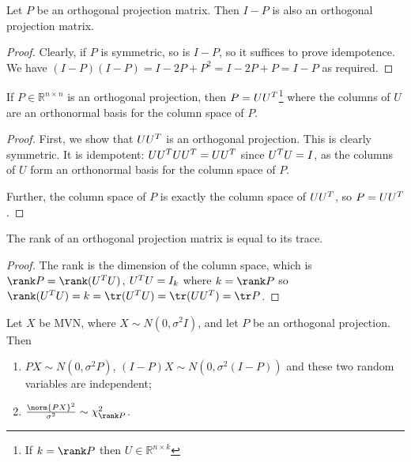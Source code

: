 \begin{corollary}
	Let $P$ be an orthogonal projection matrix.
	Then $I-P$ is also an orthogonal projection matrix.
\end{corollary}

\begin{proof}
	Clearly, if $P$ is symmetric, so is $I-P$, so it suffices to prove idempotence.
	We have $(I-P)(I-P) = I - 2P + P^2 = I - 2P + P = I - P$ as required.
\end{proof}

\begin{proposition}
	If $P \in \mathbb{R}^{n \times n}$ is an orthogonal projection, then $P = UU^T$\footnote{If $k = \rank P$ then $U \in \mathbb{R}^{n \times k}$} where the columns of $U$ are an orthonormal basis for the column space of $P$.
\end{proposition}

\begin{proof}
	First, we show that $UU^T$ is an orthogonal projection.
	This is clearly symmetric.
	It is idempotent: $U U^T U U^T = U U^T$ since $U^T U = I$, as the columns of $U$ form an orthonormal basis for the column space of $P$.

	Further, the column space of $P$ is exactly the column space of $U U^T$, so $P = U U^T$.
\end{proof}

\begin{proposition}
	The rank of an orthogonal projection matrix is equal to its trace.
\end{proposition}

\begin{proof}
	The rank is the dimension of the column space, which is $\rank P = \rank(U^\tran U)$, $U^T U = I_k$ where $k = \rank P$ so $\rank (U^\tran U) = k = \tr(U^\tran U) = \tr(U U^\tran) = \tr P$.
\end{proof}

\begin{theorem}
	Let $X$ be MVN, where $X \sim N(0,\sigma^2 I)$, and let $P$ be an orthogonal projection.
	Then
	\begin{enumerate}
		\item $PX \sim N(0,\sigma^2 P)$, $(I-P)X \sim N(0,\sigma^2(I-P))$ and these two random variables are independent;
		\item $\frac{\norm{PX}^2}{\sigma^2} \sim \chi^2_{\rank P}$.
	\end{enumerate}
\end{theorem}

